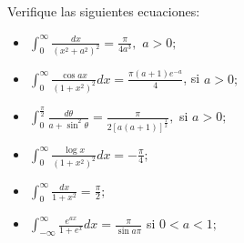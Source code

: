 \documentclass[12pt]{article}
\newenvironment{problem}[2][Problema]{\begin{trivlist}
\item[\hskip \labelsep {\bfseries #1}\hskip \labelsep {\bfseries #2.}]}{\end{trivlist}}
\begin{document}
\begin{problem}{2}
Verifique las siguientes ecuaciones: \text{ }
\begin{itemize}
    \item[(a)] $\int_0^{\infty} \frac{dx}{(x^2 + a^2)^2} = \frac{\pi}{4a^3},$ $a > 0;$
    \item[(c)] $\int_0^\infty \frac{\cos ax }{(1+x^2)^2} dx = \frac{\pi (a + 1)e^{-a}}{4}$, si $a>0;$
    \item[(d)] $\int_0^\frac{\pi}{2} \frac{d \theta}{a + \sin^2 \theta} = \frac{\pi}{2[a (a+1)]^{\frac{1}{2}}},$ si $a > 0;$
    \item[(e)] $\int_0^\infty \frac{\log x}{(1+x^2)^2} dx = -\frac{\pi}{4};$
    \item[(f)] $\int_0^\infty \frac{dx}{1+x^2} = \frac{\pi}{2};$
    \item[(g)] $\int_{-\infty}^\infty \frac{e^{ax}}{1+e^x} dx = \frac{\pi}{\sin a \pi}$ si $0 < a < 1;$
\end{itemize}
\end{problem}
\end{document}
